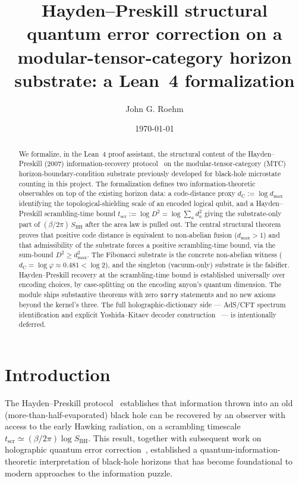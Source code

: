 \documentclass[twocolumn]{revtex4-2}
\newcommand{\dC}{d_{\mathrm{C}}}
\newcommand{\Dsq}{D^{2}}
\newcommand{\dmax}{d_{\max}}
\newcommand{\Tscr}{t_{\mathrm{scr}}}
\begin{document}
\title{Hayden--Preskill structural quantum error correction on a
modular-tensor-category horizon substrate: a Lean~4 formalization}

\author{John G. Roehm}

\date{\today}

\begin{abstract}
We formalize, in the Lean~4 proof assistant, the structural content of
the Hayden--Preskill (2007) information-recovery
protocol~\cite{HaydenPreskill2007} on the modular-tensor-category
(MTC) horizon-boundary-condition substrate previously developed for
black-hole microstate counting in this project. The formalization
defines two information-theoretic observables on top of the existing
horizon data: a code-distance proxy
$\dC := \log\dmax$ identifying the topological-shielding scale of an
encoded logical qubit, and a Hayden--Preskill scrambling-time bound
$\Tscr := \log\Dsq = \log\sum_a d_a^2$ giving the substrate-only part
of $(\beta/2\pi)\,S_{\mathrm{BH}}$ after the area law is pulled out.
The central structural theorem proves that positive code distance is
equivalent to non-abelian fusion ($\dmax > 1$) and that admissibility
of the substrate forces a positive scrambling-time bound, via the
sum-bound $\Dsq \ge \dmax^2$. The Fibonacci substrate is the concrete
non-abelian witness ($\dC = \log\varphi \approx 0.481 < \log 2$), and
the singleton (vacuum-only) substrate is the falsifier. Hayden--Preskill
recovery at the scrambling-time bound is established universally over
encoding choices, by case-splitting on the encoding anyon's quantum
dimension. The module ships \qecHolographyThms{} substantive theorems with zero
\texttt{sorry} statements and no new axioms beyond the kernel's three.
The full holographic-dictionary side --- AdS/CFT spectrum identification
and explicit Yoshida--Kitaev decoder construction~\cite{YoshidaKitaev2017}
--- is intentionally deferred.
\end{abstract}

\maketitle

\section{Introduction}
\label{sec:intro}

The Hayden--Preskill protocol~\cite{HaydenPreskill2007} establishes
that information thrown into an old (more-than-half-evaporated) black
hole can be recovered by an observer with access to the early Hawking
radiation, on a scrambling timescale
$t_{\mathrm{scr}} \simeq (\beta/2\pi)\log S_{\mathrm{BH}}$. This
result, together with subsequent work on holographic quantum error
correction~\cite{AlmheiriDongHarlow2015,PYHP2015}, established a
quantum-information-theoretic interpretation of black-hole horizons
that has become foundational to modern approaches to the information
puzzle.
\end{document}
